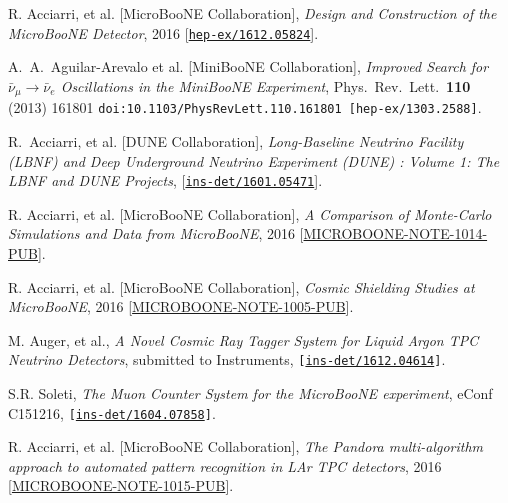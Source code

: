 \documentclass[a4paper,11pt]{article}
\begin{document}
\begin{thebibliography}{99}
   R. Acciarri, et al. [MicroBooNE Collaboration], \textit{Design and Construction of the MicroBooNE Detector}, 2016  [\href{https://arxiv.org/abs/1612.05824}{\texttt{hep-ex/1612.05824}}].

   A.~A.~Aguilar-Arevalo et al. [MiniBooNE Collaboration], \textit{Improved Search for $\bar \nu_\mu \rightarrow \bar \nu_e$ Oscillations in the MiniBooNE Experiment}, Phys.\ Rev.\ Lett.\  {\bf 110} (2013) 161801 \texttt{doi:10.1103/PhysRevLett.110.161801 [hep-ex/1303.2588]}.

   R.~Acciarri, et al. [DUNE Collaboration], \textit{Long-Baseline Neutrino Facility (LBNF) and Deep Underground Neutrino Experiment (DUNE) : Volume 1: The LBNF and DUNE Projects}, [\href{https://arxiv.org/abs/1601.05471}{\texttt{ins-det/1601.05471}}].

   R. Acciarri, et al. [MicroBooNE Collaboration], \textit{A Comparison of Monte-Carlo Simulations and Data from MicroBooNE}, 2016 [\href{http://www-microboone.fnal.gov/publications/publicnotes/index.html}{MICROBOONE-NOTE-1014-PUB}].

   R. Acciarri, et al. [MicroBooNE Collaboration], \textit{Cosmic Shielding Studies at MicroBooNE}, 2016 [\href{http://www-microboone.fnal.gov/publications/publicnotes/index.html}{MICROBOONE-NOTE-1005-PUB}].

   M. Auger, et al., \textit{A Novel Cosmic Ray Tagger System for Liquid Argon TPC Neutrino Detectors}, submitted to Instruments, \texttt{[\href{https://arxiv.org/abs/1612.04614}{ins-det/1612.04614}]}.

   S.R. Soleti, \textit{The Muon Counter System for the MicroBooNE experiment}, eConf C151216, \texttt{[\href{https://arxiv.org/abs/1604.07858}{ins-det/1604.07858}]}.

   R. Acciarri, et al. [MicroBooNE Collaboration], \textit{The Pandora multi-algorithm approach to automated pattern recognition in LAr TPC detectors}, 2016  [\href{http://www-microboone.fnal.gov/publications/publicnotes/index.html}{MICROBOONE-NOTE-1015-PUB}].



\end{thebibliography}
\end{document}
